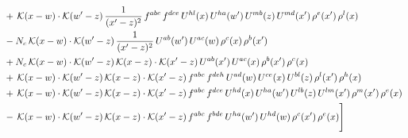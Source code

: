 \documentclass[9pt]{article}
\numberwithin{equation}{section}
\begin{document}
\begin{align}
&+\,\mathcal{K}(x-w)\cdot\mathcal{K}(w'-z)\,\frac{1}{(x'-z)^{2}}\,f^{abc}\,f^{dce}\,U^{hl}(x)\,U^{ha}(w')\,U^{mb}(z)\,U^{md}(x')\,\rho^{e}(x')\,\rho^{l}(x)\notag \\
&-N_{c}\,\mathcal{K}(x-w)\cdot\mathcal{K}(w'-z)\,\frac{1}{(x'-z)^{2}}\,U^{ab}(w')\,U^{ac}(w)\,\rho^{c}(x)\,\rho^{b}(x')\notag \\
&+N_{c}\,\mathcal{K}(x-w)\cdot\mathcal{K}(w'-z)\,\mathcal{K}(x-z)\cdot\mathcal{K}(x'-z)\,U^{ab}(x')\,U^{ac}(x)\,\rho^{b}(x')\,\rho^{c}(x)\notag \\
&+\,\mathcal{K}(x-w)\cdot\mathcal{K}(w'-z)\,\mathcal{K}(x-z)\cdot\mathcal{K}(x'-z)\,f^{abc}\,f^{deh}\,U^{ad}(w)\,U^{ce}(x)\,U^{bl}(z)\,\rho^{l}(x')\,\rho^{h}(x)\notag \\
&+\,\mathcal{K}(x-w)\cdot\mathcal{K}(w'-z)\,\mathcal{K}(x-z)\cdot\mathcal{K}(x'-z)\,f^{abc}\,f^{dce}\,U^{hd}(x)\,U^{ha}(w')\,U^{lb}(z)\,U^{lm}(x')\,\rho^{m}(x')\,\rho^{e}(x)\notag \\
&-\,\mathcal{K}(x-w)\cdot\mathcal{K}(w'-z)\,\mathcal{K}(x-z)\cdot\mathcal{K}(x'-z)\,f^{abc}\,f^{bde}\,U^{ha}(w')\,U^{hd}(w)\,\rho^{c}(x')\,\rho^{e}(x)\Bigg]
\end{align}
\end{document}
